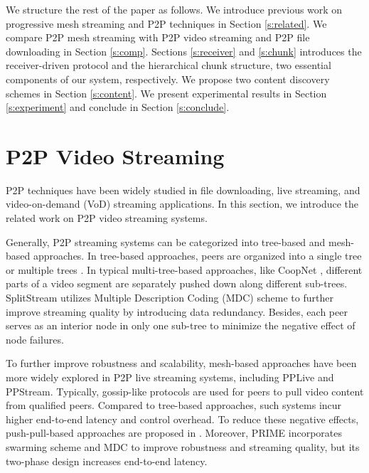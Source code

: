     We structure the rest of the paper as follows.  We
    introduce previous work on progressive mesh streaming
    and P2P techniques in Section \ref{s:related}.  We
    compare P2P mesh streaming with P2P video streaming and
    P2P file downloading in Section \ref{s:comp}.  
    Sections \ref{s:receiver} and \ref{s:chunk} introduces the
    receiver-driven protocol and the hierarchical chunk structure,
    two essential components of our system, respectively.  We propose two content discovery schemes
    in Section \ref{s:content}.
    We present experimental results in Section
    \ref{s:experiment} and conclude in Section
    \ref{s:conclude}.

\section{P2P Video Streaming}
\label{ss:related_p2p}
P2P techniques have been widely studied in file downloading, live
streaming, and video-on-demand (VoD) streaming applications. In this section,
we introduce the related work on P2P video streaming systems.

Generally, P2P streaming systems can be categorized into tree-based
and mesh-based approaches. In tree-based approaches, peers are
organized into a single tree \cite{jannotti:overcast, chu:narada}
or multiple trees \cite{castro:splitstream,
padmanabhan:coopnet}.
In typical multi-tree-based
approaches, like CoopNet \cite{padmanabhan:coopnet}, different parts of a video segment are
separately pushed down along different sub-trees. SplitStream
\cite{castro:splitstream}
utilizes Multiple Description Coding (MDC) scheme to further improve
streaming quality by introducing data redundancy. Besides, each peer
serves as an interior node in only one sub-tree to minimize the
negative effect of node failures. 

To further improve robustness and scalability, mesh-based approaches
have been more widely explored in P2P live streaming systems,
including PPLive and PPStream. Typically, gossip-like protocols are
used for peers to pull video content from qualified peers. Compared to
tree-based approaches, such systems incur higher end-to-end latency
and control overhead. To reduce these negative effects,
push-pull-based approaches are proposed in \cite{zhang:coolstreaming}. 
Moreover, PRIME \cite{magharei:prime}
incorporates swarming scheme and MDC to improve robustness and
streaming quality, but its two-phase design increases end-to-end
latency.

